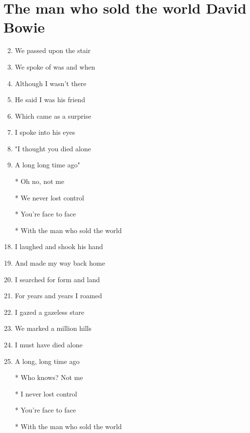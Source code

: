 \documentclass{article}
\begin{document}
    
    \section*{The man who sold the world \of David Bowie}

    \begin{center}
        \begin{enumerate}

            \item[] 
            \item We passed upon the stair
            \item We spoke of was and when
            \item Although I wasn't there
            \item He said I was his friend
            \item Which came as a surprise
            \item I spoke into his eyes
            \item "I thought you died alone
            \item A long long time ago"
            
            \item[]

            \item[] \chorus
            \item[*] Oh no, not me
            \item[*] We never lost control
            \item[*] You're face to face
            \item[*] With the man who sold the world
            
            \item[]

            \item[] 
            \item I laughed and shook his hand
            \item And made my way back home
            \item I searched for form and land
            \item For years and years I roamed
            \item I gazed a gazeless stare
            \item We marked a million hills
            \item I must have died alone
            \item A long, long time ago
            
            \item[]

            \item[] 
            \item[*] Who knows? Not me
            \item[*] I never lost control
            \item[*] You're face to face
            \item[*] With the man who sold the world

        \end{enumerate}
    \end{center}
\end{document}
